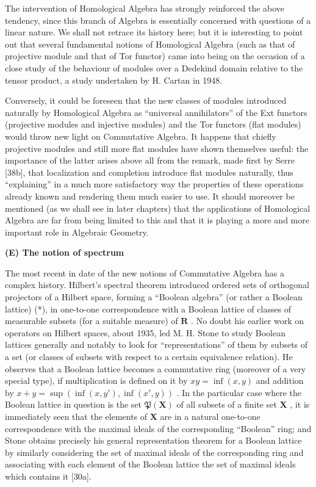The intervention of Homological Algebra has strongly reinforced the above tendency, since this branch of Algebra is essentially concerned with questions of a linear nature. We shall not retrace its history here; but it is interesting to point out that several fundamental notions of Homological Algebra (such as that of projective module and that of Tor functor) came into being on the occasion of a close study of the behaviour of modules over a Dedekind domain relative to the tensor product, a study undertaken by H. Cartan in 1948.

Conversely, it could be foreseen that the new classes of modules introduced naturally by Homological Algebra as ``universal annihilators'' of the Ext functors (projective modules and injective modules) and the Tor functors (flat modules) would throw new light on Commutative Algebra. It happens that chiefly projective modules and still more flat modules have shown themselves useful: the importance of the latter arises above all from the remark, made first by Serre {[}38b{]}, that localization and completion introduce flat modules naturally, thus ``explaining'' in a much more satisfactory way the properties of these operations already known and rendering them much easier to use. It should moreover be mentioned (as we shall see in later chapters) that the applications of Homological Algebra are far from being limited to this and that it is playing a more and more important role in Algebraic Geometry.

\textbf{(E) The notion of spectrum}\par

The most recent in date of the new notions of Commutative Algebra has a complex history. Hilbert's spectral theorem introduced ordered sets of orthogonal projectors of a Hilbert space, forming a ``Boolean algebra'' (or rather a Boolean lattice) (*), in one-to-one correspondence with a Boolean lattice of classes of measurable subsets (for a suitable measure) of \(\mathbf{R}\) . No doubt his earlier work on operators on Hilbert spaces, about 1935, led M. H. Stone to study Boolean lattices generally and notably to look for ``representations'' of them by subsets of a set (or classes of subsets with respect to a certain equivalence relation). He observes that a Boolean lattice becomes a commutative ring (moreover of a very special type), if multiplication is defined on it by \(xy = \inf(x, y)\) and addition by \(x + y = \sup(\inf(x, y'), \inf(x', y))\) . In the particular case where the Boolean lattice in question is the set \(\mathfrak{P}(\mathbf{X})\) of all subsets of a finite set \(\mathbf{X}\) , it is immediately seen that the elements of \(\mathbf{X}\) are in a natural one-to-one correspondence with the maximal ideals of the corresponding ``Boolean'' ring; and Stone obtains precisely his general representation theorem for a Boolean lattice by similarly considering the set of maximal ideals of the corresponding ring and associating with each element of the Boolean lattice the set of maximal ideals which contains it {[}30a{]}.

